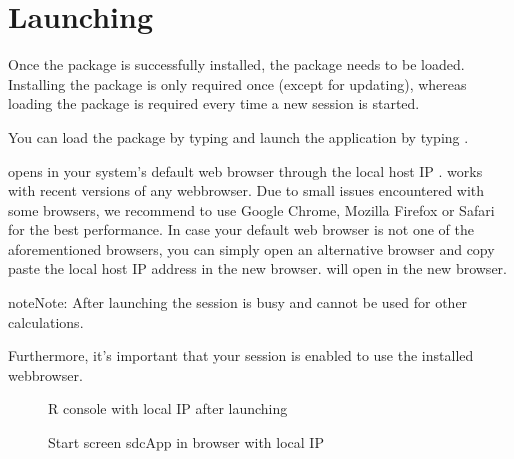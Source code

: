 \documentclass[letterpaper,10pt,english]{sphinxmanual}
\begin{document}
\section{Launching }
\label{\detokenize{installation:launching-sdcapp}}
Once the  package is successfully installed, the  package needs to be loaded.
Installing the package is only required once (except for updating), whereas loading the
package is required every time a new  session is started.

You can load the  package by typing 
and launch the application by typing .

 opens in your system’s default web browser through the local host IP .
 works with recent versions of any webbrowser.
Due to small issues encountered with some browsers, we recommend to use Google Chrome, Mozilla Firefox or Safari for the best performance.
In case your default web browser is not one of the aforementioned browsers, you can simply open an
alternative browser and copy paste the local host IP address in the new browser.
 will open in the new browser.

\begin{sphinxadmonition}{note}{Note:}
After launching  the  session is busy and cannot be used for other calculations.
\end{sphinxadmonition}

Furthermore, it’s important that your  session is enabled to use the installed webbrowser.

\begin{figure}[htbp]
\centering
\capstart

\noindent{}
\caption{R console with local IP after launching }\label{\detokenize{installation:fig25}}\label{\detokenize{installation:id14}}\end{figure}

\begin{figure}[htbp]
\centering
\capstart

\noindent{}
\caption{Start screen sdcApp in browser with local IP}\label{\detokenize{installation:fig26}}\label{\detokenize{installation:id15}}\end{figure}
\end{document}
